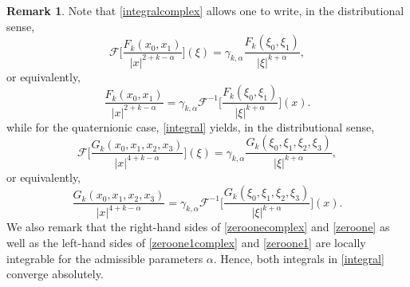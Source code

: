 \documentclass[reqno,11pt]{amsart}
\theoremstyle{definition}
\newtheorem{remark}[theorem]{Remark}
\begin{document}
\begin{remark}
	Note that \eqref{integralcomplex} allows one to write, in the distributional sense,
	\begin{equation}
		\label{zeroonecomplex}
		\mathcal{F} \bigg[ \frac{F_k(x_0,x_1)}{|x|^{2+k-\alpha}}\bigg](\xi)= \gamma_{k,\alpha} \frac{F_k(\xi_0,\xi_1)}{|\xi|^{k+\alpha}},
	\end{equation}
	or equivalently,
	\begin{equation}
		\label{zeroone1complex}
		\frac{F_k(x_0,x_1)}{|x|^{2+k-\alpha}}=\gamma_{k,\alpha} \mathcal{F}^{-1} \bigg[ \frac{F_k(\xi_0,\xi_1)}{|\xi|^{k+\alpha}} \bigg](x).
	\end{equation}
	while for the quaternionic case, \eqref{integral} yields, in the distributional sense,
	\begin{equation}
		\label{zeroone}
		\mathcal{F} \bigg[ \frac{G_k(x_0,x_1,x_2,x_3)}{|x|^{4+k-\alpha}}\bigg](\xi)= \gamma_{k,\alpha} \frac{G_k(\xi_0,\xi_1,\xi_2,\xi_3)}{|\xi|^{k+\alpha}},
	\end{equation}
	or equivalently,
	\begin{equation}
		\label{zeroone1}
		\frac{G_k(x_0,x_1,x_2,x_3)}{|x|^{4+k-\alpha}}=\gamma_{k,\alpha} \mathcal{F}^{-1} \bigg[ \frac{G_k(\xi_0,\xi_1,\xi_2,\xi_3)}{|\xi|^{k+\alpha}} \bigg](x).
	\end{equation}
	We also remark that the right-hand sides of \eqref{zeroonecomplex} and \eqref{zeroone} as well as the left-hand sides of \eqref{zeroone1complex} and \eqref{zeroone1} are locally integrable for the admissible parameters $\alpha$. Hence, both integrals in \eqref{integral} converge absolutely.
\end{remark}	
\end{document}
